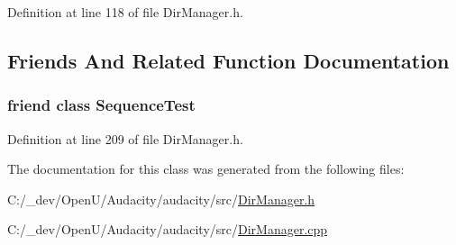 Definition at line 118 of file Dir\+Manager.\+h.



\subsection{Friends And Related Function Documentation}
\subsubsection[{\texorpdfstring{Sequence\+Test}{SequenceTest}}]{\setlength{\rightskip}{0pt plus 5cm}friend class {\bf Sequence\+Test}\hspace{0.3cm}{\ttfamily [friend]}}\hypertarget{class_dir_manager_a81667f7d1cfd26791cb795fc88839fd2}{}\label{class_dir_manager_a81667f7d1cfd26791cb795fc88839fd2}


Definition at line 209 of file Dir\+Manager.\+h.



The documentation for this class was generated from the following files\+:\begin{DoxyCompactItemize}
\item 
C\+:/\+\_\+dev/\+Open\+U/\+Audacity/audacity/src/\hyperlink{_dir_manager_8h}{Dir\+Manager.\+h}\item 
C\+:/\+\_\+dev/\+Open\+U/\+Audacity/audacity/src/\hyperlink{_dir_manager_8cpp}{Dir\+Manager.\+cpp}\end{DoxyCompactItemize}
